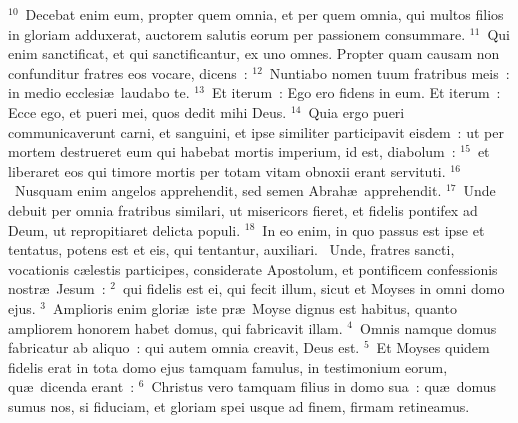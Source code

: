 ${}^{10}$~Decebat enim eum, propter quem omnia, et per quem omnia, qui multos filios in gloriam adduxerat, auctorem salutis eorum per passionem consummare.
${}^{11}$~Qui enim sanctificat, et qui sanctificantur, ex uno omnes. Propter quam causam non confunditur fratres eos vocare, dicens~:
${}^{12}$~Nuntiabo nomen tuum fratribus meis~: in medio ecclesi\ae\ laudabo te.
${}^{13}$~Et iterum~: Ego ero fidens in eum. Et iterum~: Ecce ego, et pueri mei, quos dedit mihi Deus.
${}^{14}$~Quia ergo pueri communicaverunt carni, et sanguini, et ipse similiter participavit eisdem~: ut per mortem destrueret eum qui habebat mortis imperium, id est, diabolum~:
${}^{15}$~et liberaret eos qui timore mortis per totam vitam obnoxii erant servituti.
${}^{16}$~Nusquam enim angelos apprehendit, sed semen Abrah\ae\ apprehendit.
${}^{17}$~Unde debuit per omnia fratribus similari, ut misericors fieret, et fidelis pontifex ad Deum, ut repropitiaret delicta populi.
${}^{18}$~In eo enim, in quo passus est ipse et tentatus, potens est et eis, qui tentantur, auxiliari.
~Unde, fratres sancti, vocationis c\ae lestis participes, considerate Apostolum, et pontificem confessionis nostr\ae\ Jesum~:
${}^{2}$~qui fidelis est ei, qui fecit illum, sicut et Moyses in omni domo ejus.
${}^{3}$~Amplioris enim glori\ae\ iste pr\ae\ Moyse dignus est habitus, quanto ampliorem honorem habet domus, qui fabricavit illam.
${}^{4}$~Omnis namque domus fabricatur ab aliquo~: qui autem omnia creavit, Deus est.
${}^{5}$~Et Moyses quidem fidelis erat in tota domo ejus tamquam famulus, in testimonium eorum, qu\ae\ dicenda erant~:
${}^{6}$~Christus vero tamquam filius in domo sua~: qu\ae\ domus sumus nos, si fiduciam, et gloriam spei usque ad finem, firmam retineamus.



